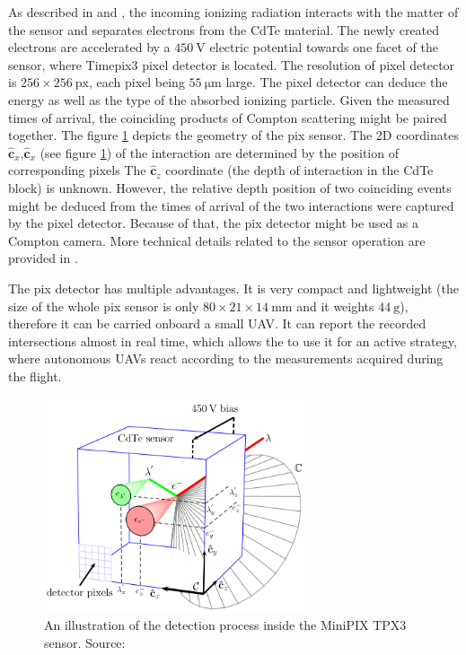 As described in \cite{baca2021gamma} and \cite{baca2019timepix}, the incoming ionizing radiation interacts with the matter of the sensor and separates electrons from the CdTe material.
The newly created electrons are accelerated by a $\SI{450}\volt$ electric potential towards one facet of the sensor, where Timepix3 pixel detector is located.
The resolution of pixel detector is $256 \times 256\ \mathrm{px}$, each pixel being $55\ \si{\micro\meter}$ large.
The pixel detector can deduce the energy as well as the type of the absorbed ionizing particle.
Given the measured times of arrival, the coinciding products of Compton scattering might be paired together.
The figure \ref{fig:minipix} depicts the geometry of the \ac{pix} sensor.
The 2D coordinates $\mathbf{\hat{c}}_{x}$,$\mathbf{\hat{c}}_{x}$ (see figure \ref{fig:minipix}) of the interaction are determined by the position of corresponding pixels
The $\mathbf{\hat{c}}_{z}$ coordinate (the depth of interaction in the CdTe block) is unknown.
However, the relative depth position of two coinciding events might be deduced from the times of arrival of the two interactions were captured by the pixel detector.
Because of that, the \ac{pix} detector might be used as a Compton camera.
More technical details related to the sensor operation are provided in \cite{baca2019timepix}.

The \ac{pix} detector has multiple advantages.
It is very compact and lightweight (the size of the whole \ac{pix} sensor is only $80 \times 21 \times 14 \ \si{\milli\meter}$ and it weights $\SI{44}{\gram}$), therefore it can be carried onboard a small \ac{UAV}.
It can report the recorded intersections almost in real time, which allows the to use it for an active strategy, where autonomous \ac{UAV}s react according to the measurements acquired during the flight.

\begin{figure}[!h]
    \centering
    \includegraphics[width=0.7\textwidth]{./fig/photos/minipix.png}
    \caption{An illustration of the detection process inside the MiniPIX TPX3 sensor. Source: \cite{baca2021gamma}}
    \label{fig:minipix}
\end{figure}



